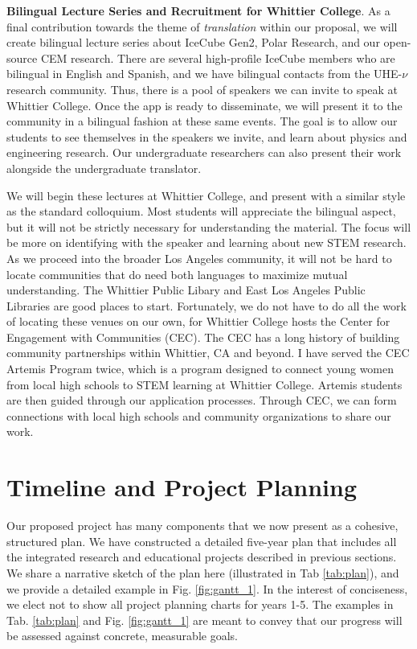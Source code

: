 \documentclass[../../main.tex]{subfiles}
\begin{document}
\textbf{Bilingual Lecture Series and Recruitment for Whittier College}.  As a final contribution towards the theme of \textit{translation} within our proposal, we will create bilingual lecture series about IceCube Gen2, Polar Research, and our open-source CEM research.  There are several high-profile IceCube members who are bilingual in English and Spanish, and we have bilingual contacts from the UHE-$\nu$ research community.  Thus, there is a pool of speakers we can invite to speak at Whittier College.  Once the app is ready to disseminate, we will present it to the community in a bilingual fashion at these same events.  The goal is to allow our students to see themselves in the speakers we invite, and learn about physics and engineering research.  Our undergraduate researchers can also present their work alongside the undergraduate translator. \\ \vspace{2.5mm}

We will begin these lectures at Whittier College, and present with a similar style as the standard colloquium.  Most students will appreciate the bilingual aspect, but it will not be strictly necessary for understanding the material.  The focus will be more on identifying with the speaker and learning about new STEM research.  As we proceed into the broader Los Angeles community, it will not be hard to locate communities that do need both languages to maximize mutual understanding.  The Whittier Public Libary and East Los Angeles Public Libraries are good places to start.  Fortunately, we do not have to do all the work of locating these venues on our own, for Whittier College hosts the Center for Engagement with Communities (CEC).  The CEC has a long history of building community partnerships within Whittier, CA and beyond.  I have served the CEC Artemis Program twice, which is a program designed to connect young women from local high schools to STEM learning at Whittier College.  Artemis students are then guided through our application processes.  Through CEC, we can form connections with local high schools and community organizations to share our work.

\section{Timeline and Project Planning}
\label{sec:time_im}

Our proposed project has many components that we now present as a cohesive, structured plan.  We have constructed a detailed five-year plan that includes all the integrated research and educational projects described in previous sections.  We share a narrative sketch of the plan here (illustrated in Tab \ref{tab:plan}), and we provide a detailed example in Fig. \ref{fig:gantt_1}.  In the interest of conciseness, we elect not to show all project planning charts for years 1-5.  The examples in Tab. \ref{tab:plan} and Fig. \ref{fig:gantt_1} are meant to convey that our progress will be assessed against concrete, measurable goals. \\ \vspace{2.5mm}
\end{document}
